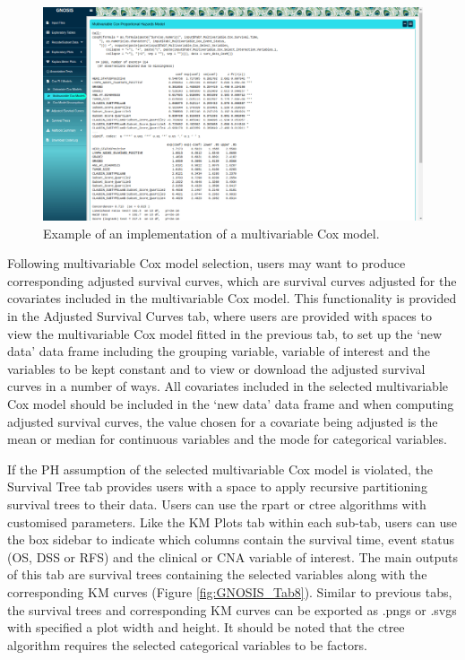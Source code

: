 \begin{figure}[!hp]
\center
\includegraphics[width=1\textwidth]{../figures/Chapter_3/GNOSIS_Fig7.png}
\caption[Example of an implementation of a multivariable Cox model.]{Example of an implementation of a multivariable Cox model.}
\label{fig:GNOSIS_MVC}
\end{figure}


Following multivariable Cox model selection, users may want to produce corresponding adjusted survival curves, which are survival curves adjusted for the covariates included in the multivariable Cox model. This functionality is provided in the Adjusted Survival Curves tab, where users are provided with spaces to view the multivariable Cox model fitted in the previous tab, to set up the ‘new data’ data frame including the grouping variable, variable of interest and the variables to be kept constant and to view or download the adjusted survival curves in a number of ways. All covariates included in the selected multivariable Cox model should be included in the ‘new data’ data frame and when computing adjusted survival curves, the value chosen for a covariate being adjusted is the mean or median for continuous variables and the mode for categorical variables. 

If the PH assumption of the selected multivariable Cox model is violated, the Survival Tree tab provides users with a space to apply recursive partitioning survival trees to their data. Users can use the rpart \citep{rpart} or ctree \citep{ctree1, hothorn_hornik_zeileis_2006} algorithms with customised parameters. Like the KM Plots tab within each sub-tab, users can use the box sidebar to indicate which columns contain the survival time, event status (OS, DSS or RFS) and the clinical or CNA variable of interest. The main outputs of this tab are survival trees containing the selected variables along with the corresponding KM curves (Figure \ref{fig:GNOSIS_Tab8}). Similar to previous tabs, the survival trees and corresponding KM curves can be exported as .pngs or .svgs with specified a plot width and height. It should be noted that the ctree algorithm requires the selected categorical variables to be factors. 

